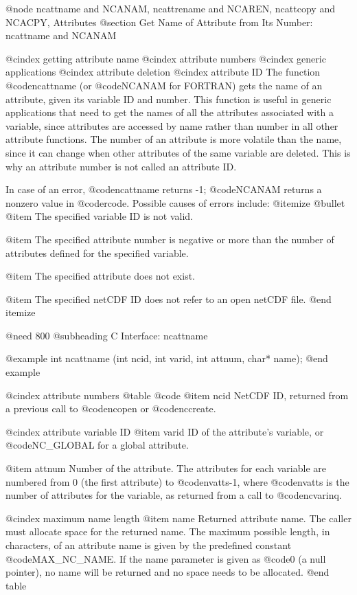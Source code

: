 {@node ncattname and NCANAM, ncattrename and NCAREN, ncattcopy and NCACPY, Attributes
@section Get Name of Attribute from Its Number:  ncattname and NCANAM

@cindex getting attribute name
@cindex attribute numbers
@cindex generic applications
@cindex attribute deletion
@cindex attribute ID
The function @code{ncattname} (or @code{NCANAM} for FORTRAN) gets the
name of an attribute, given its variable ID and number.
This function is useful in generic applications that
need to get the names of all the attributes associated with a variable,
since attributes are accessed by name rather than number in all other
attribute functions.  The number of an attribute is more volatile than
the name, since it can change when other attributes of the same variable
are deleted.  This is why an attribute number is not called an attribute
ID.

In case of an error, @code{ncattname} returns -1; @code{NCANAM} returns a
nonzero value in @code{rcode}.  Possible causes of errors include:
@itemize @bullet
@item
The specified variable ID is not valid.

@item
The specified attribute number is negative or more than the number of
attributes defined for the specified variable.

@item
The specified attribute does not exist.

@item
The specified netCDF ID does not refer to an open netCDF file.
@end itemize

@need 800
@subheading C Interface:  ncattname

@example
int ncattname (int ncid, int varid, int attnum, char* name);
@end example

@cindex attribute numbers
@table @code
@item ncid
NetCDF ID, returned from a previous call to @code{ncopen} or @code{nccreate}.

@cindex attribute variable ID
@item varid
ID of the attribute's variable, or @code{NC_GLOBAL} for a global
attribute.

@item attnum
Number of the attribute.  The attributes for each variable are numbered
from 0 (the first attribute) to @code{nvatts-1}, where @code{nvatts} is
the number of attributes for the variable, as returned from a call to
@code{ncvarinq}.

@cindex maximum name length
@item name
Returned attribute name.  The caller must allocate space for the
returned name.  The maximum possible length, in characters, of an
attribute name is given by the predefined constant @code{MAX_NC_NAME}.
If the name parameter is given as @code{0} (a null pointer), no name will be
returned and no space needs to be allocated.
@end table

}
